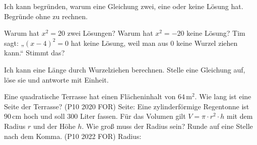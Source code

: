 \begin{aufgabe}{Ich kann begründen, warum eine Gleichung zwei, eine oder keine Lösung hat.}
Begründe ohne zu rechnen.
\begin{teile}
\teil Warum hat $x^2 = 20$ zwei Lösungen?
\teil Warum hat $x^2 = -20$ keine Lösung?
\teil Tim sagt: „$(x - 4)^2 = 0$ hat keine Lösung, weil man aus $0$ keine Wurzel ziehen kann.“ Stimmt das?
\end{teile}
\end{aufgabe}

\begin{aufgabe}{Ich kann eine Länge durch Wurzelziehen berechnen.}
Stelle eine Gleichung auf, löse sie und antworte mit Einheit.
\begin{teile}
\teil Eine quadratische Terrasse hat einen Flächeninhalt von $64\,\text{m}^2$. Wie lang ist eine Seite der Terrasse? (P10 2020 FOR) \hfill Seite: \leerfeld[m]
\teil Eine zylinderförmige Regentonne ist $90\,\text{cm}$ hoch und soll $300$ Liter fassen. Für das Volumen gilt $V = \pi\cdot r^2\cdot h$ mit dem Radius $r$ und der Höhe $h$. Wie groß muss der Radius sein? Runde auf eine Stelle nach dem Komma. (P10 2022 FOR) \hfill Radius: \leerfeld[cm]
\end{teile}
\end{aufgabe}

